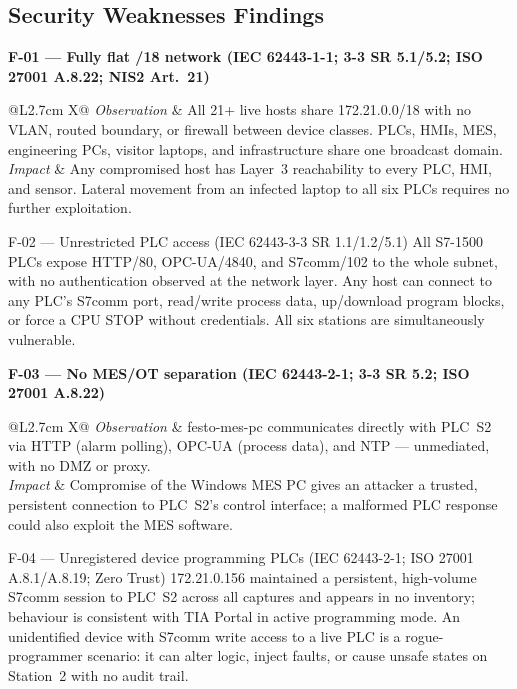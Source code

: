 \documentclass[11pt,a4paper]{article}
\begin{document}
\subsection{Security Weaknesses Findings}
\newcommand{\finding}[4]{%
\par\smallskip\noindent\textbf{#1}\\[2pt]
\begin{tabularx}{\linewidth}{@{}L{2.7cm} X@{}}
\textit{Observation} & #2 \\
\textit{Impact} & #3 \\
\end{tabularx}\par}

\finding{F-01 --- Fully flat /18 network (IEC 62443-1-1; 3-3 SR 5.1/5.2; ISO 27001 A.8.22; NIS2 Art.~21)}
{All 21+ live hosts share 172.21.0.0/18 with no VLAN, routed boundary, or firewall between device classes. PLCs, HMIs, MES, engineering PCs, visitor laptops, and infrastructure share one broadcast domain.}
{Any compromised host has Layer~3 reachability to every PLC, HMI, and sensor. Lateral movement from an infected laptop to all six PLCs requires no further exploitation.}

\finding{F-02 --- Unrestricted PLC access (IEC 62443-3-3 SR 1.1/1.2/5.1)}
{All S7-1500 PLCs expose HTTP/80, OPC-UA/4840, and S7comm/102 to the whole subnet, with no authentication observed at the network layer.}
{Any host can connect to any PLC's S7comm port, read/write process data, up/download program blocks, or force a CPU STOP without credentials. All six stations are simultaneously vulnerable.}

\finding{F-03 --- No MES/OT separation (IEC 62443-2-1; 3-3 SR 5.2; ISO 27001 A.8.22)}
{festo-mes-pc communicates directly with PLC~S2 via HTTP (alarm polling), OPC-UA (process data), and NTP --- unmediated, with no DMZ or proxy.}
{Compromise of the Windows MES PC gives an attacker a trusted, persistent connection to PLC~S2's control interface; a malformed PLC response could also exploit the MES software.}

\finding{F-04 --- Unregistered device programming PLCs (IEC 62443-2-1; ISO 27001 A.8.1/A.8.19; Zero Trust)}
{172.21.0.156 maintained a persistent, high-volume S7comm session to PLC~S2 across all captures and appears in no inventory; behaviour is consistent with TIA Portal in active programming mode.}
{An unidentified device with S7comm write access to a live PLC is a rogue-programmer scenario: it can alter logic, inject faults, or cause unsafe states on Station~2 with no audit trail.}
\end{document}
